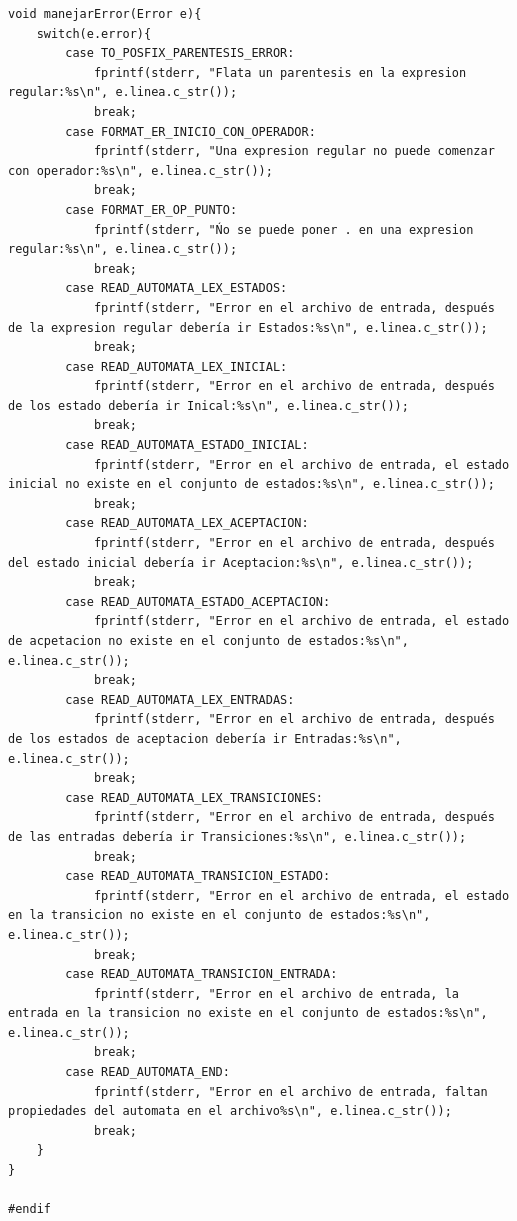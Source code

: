\documentclass[a4paper,12pt]{article}
\begin{document}
\begin{enumerate}
\begin{lstlisting}
void manejarError(Error e){
    switch(e.error){
        case TO_POSFIX_PARENTESIS_ERROR:
            fprintf(stderr, "Flata un parentesis en la expresion regular:%s\n", e.linea.c_str());
            break;
        case FORMAT_ER_INICIO_CON_OPERADOR:
            fprintf(stderr, "Una expresion regular no puede comenzar con operador:%s\n", e.linea.c_str());
            break;
        case FORMAT_ER_OP_PUNTO:
            fprintf(stderr, "Ńo se puede poner . en una expresion regular:%s\n", e.linea.c_str());
            break;
        case READ_AUTOMATA_LEX_ESTADOS:
            fprintf(stderr, "Error en el archivo de entrada, después de la expresion regular debería ir Estados:%s\n", e.linea.c_str());
            break;
        case READ_AUTOMATA_LEX_INICIAL:
            fprintf(stderr, "Error en el archivo de entrada, después de los estado debería ir Inical:%s\n", e.linea.c_str());
            break;
        case READ_AUTOMATA_ESTADO_INICIAL:
            fprintf(stderr, "Error en el archivo de entrada, el estado inicial no existe en el conjunto de estados:%s\n", e.linea.c_str());
            break;
        case READ_AUTOMATA_LEX_ACEPTACION:
            fprintf(stderr, "Error en el archivo de entrada, después del estado inicial debería ir Aceptacion:%s\n", e.linea.c_str());
            break;
        case READ_AUTOMATA_ESTADO_ACEPTACION:
            fprintf(stderr, "Error en el archivo de entrada, el estado de acpetacion no existe en el conjunto de estados:%s\n", e.linea.c_str());
            break;
        case READ_AUTOMATA_LEX_ENTRADAS:
            fprintf(stderr, "Error en el archivo de entrada, después de los estados de aceptacion debería ir Entradas:%s\n", e.linea.c_str());
            break;
        case READ_AUTOMATA_LEX_TRANSICIONES:
            fprintf(stderr, "Error en el archivo de entrada, después de las entradas debería ir Transiciones:%s\n", e.linea.c_str());
            break;
        case READ_AUTOMATA_TRANSICION_ESTADO:
            fprintf(stderr, "Error en el archivo de entrada, el estado en la transicion no existe en el conjunto de estados:%s\n", e.linea.c_str());
            break;
        case READ_AUTOMATA_TRANSICION_ENTRADA:
            fprintf(stderr, "Error en el archivo de entrada, la entrada en la transicion no existe en el conjunto de estados:%s\n", e.linea.c_str());
            break;
        case READ_AUTOMATA_END:
            fprintf(stderr, "Error en el archivo de entrada, faltan propiedades del automata en el archivo%s\n", e.linea.c_str());
            break;
    }
}

#endif
 \end{lstlisting}
\end{enumerate}
 
\end{document}
